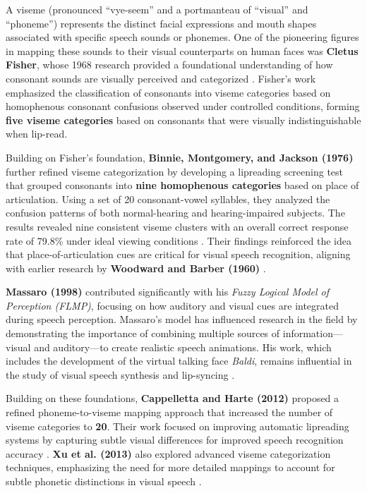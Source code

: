 \documentclass[12pt]{article}
\begin{document}
A viseme (pronounced “vye-seem” and a portmanteau of “visual” and “phoneme”) represents the distinct facial expressions and mouth shapes associated with specific speech sounds or phonemes. One of the pioneering figures in mapping these sounds to their visual counterparts on human faces was \textbf{Cletus Fisher}, whose 1968 research provided a foundational understanding of how consonant sounds are visually perceived and categorized \cite{fisher1968}. Fisher’s work emphasized the classification of consonants into viseme categories based on homophenous consonant confusions observed under controlled conditions, forming \textbf{five viseme categories} based on consonants that were visually indistinguishable when lip-read.

Building on Fisher’s foundation, \textbf{Binnie, Montgomery, and Jackson (1976)} further refined viseme categorization by developing a lipreading screening test that grouped consonants into \textbf{nine homophenous categories} based on place of articulation. Using a set of 20 consonant-vowel syllables, they analyzed the confusion patterns of both normal-hearing and hearing-impaired subjects. The results revealed nine consistent viseme clusters with an overall correct response rate of 79.8\% under ideal viewing conditions \cite{binnie1976}. Their findings reinforced the idea that place-of-articulation cues are critical for visual speech recognition, aligning with earlier research by \textbf{Woodward and Barber (1960)} \cite{woodward1960}.

\textbf{Massaro (1998)} contributed significantly with his \textit{Fuzzy Logical Model of Perception (FLMP)}, focusing on how auditory and visual cues are integrated during speech perception. Massaro's model has influenced research in the field by demonstrating the importance of combining multiple sources of information—visual and auditory—to create realistic speech animations. His work, which includes the development of the virtual talking face \textit{Baldi}, remains influential in the study of visual speech synthesis and lip-syncing \cite{Massaro1998}.

Building on these foundations, \textbf{Cappelletta and Harte (2012)} proposed a refined phoneme-to-viseme mapping approach that increased the number of viseme categories to \textbf{20}. Their work focused on improving automatic lipreading systems by capturing subtle visual differences for improved speech recognition accuracy \cite{cappelletta2012}. \textbf{Xu et al. (2013)} also explored advanced viseme categorization techniques, emphasizing the need for more detailed mappings to account for subtle phonetic distinctions in visual speech \cite{Xu213}.
\end{document}
